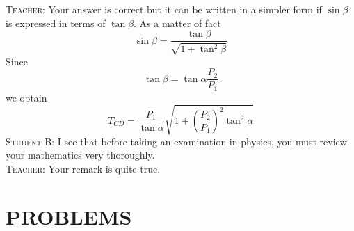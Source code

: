 \documentclass[a4paper,sfsidenotes]{tufte-book}
\begin{document}
\textsc{Teacher:} Your answer is correct but it can be written in a
simpler form if $\sin \beta$ is expressed in terms of $\tan \beta$. As a matter of fact
\\
\begin{equation*}
\sin \beta = \frac{\tan \beta}{ \sqrt{1 + \tan^{2} \beta}}
\end{equation*}
Since \\
\begin{equation*}
\tan \beta = \tan \alpha \frac{P_{2}}{P_{1}}
\end{equation*}
 we obtain 
\begin{equation*}
T_{CD} = \frac{P_{1}}{\tan \alpha} \sqrt{1 + \left( \frac{P_{2}}{P_{1}} \right)^{2} \tan^{2} \alpha }
\end{equation*}
\textsc{Student B:} I see that before taking an examination in physics, you must review your mathematics very thoroughly.
\\
\textsc{Teacher:} Your remark is quite true.
\\
\section{PROBLEMS}
\label{sec-15-1}
\end{document}
